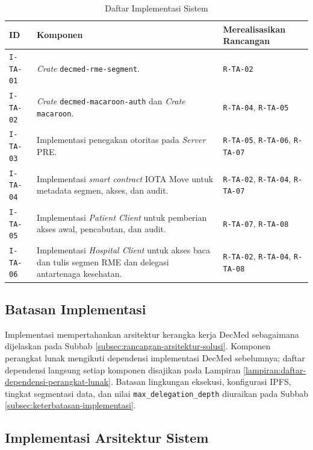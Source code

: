\documentclass[bahasa, 12pt, a4paper, onecolumn, oneside, final]{report}
\begin{document}
\begin{table}[!ht]
	\centering
	\caption{Daftar Implementasi Sistem}
	\label{tab:daftar-implementasi-sistem}
	\small
	\begin{tabular}{|p{}|p{}|p{}|}
		\hline
		\textbf{ID}      & \textbf{Komponen}                                                                                               & \textbf{Merealisasikan Rancangan}                    \\ \hline
		\texttt{I-TA-01} & \textit{Crate} \texttt{decmed-rme-segment}.                                                                     & \texttt{R-TA-02}                                     \\ \hline
		\texttt{I-TA-02} & \textit{Crate} \texttt{decmed-macaroon-auth} dan \textit{Crate} \texttt{macaroon}.                              & \texttt{R-TA-04}, \texttt{R-TA-05}                   \\ \hline
		\texttt{I-TA-03} & Implementasi penegakan otoritas pada \textit{Server} PRE.                                                       & \texttt{R-TA-05}, \texttt{R-TA-06}, \texttt{R-TA-07} \\ \hline
		\texttt{I-TA-04} & Implementasi \textit{smart contract} IOTA Move untuk metadata segmen, akses, dan audit.                         & \texttt{R-TA-02}, \texttt{R-TA-04}, \texttt{R-TA-07} \\ \hline
		\texttt{I-TA-05} & Implementasi \textit{Patient Client} untuk pemberian akses awal, pencabutan, dan audit.                         & \texttt{R-TA-07}, \texttt{R-TA-08}                   \\ \hline
		\texttt{I-TA-06} & Implementasi \textit{Hospital Client} untuk akses baca dan tulis segmen RME dan delegasi antartenaga kesehatan. & \texttt{R-TA-02}, \texttt{R-TA-04}, \texttt{R-TA-08} \\ \hline
	\end{tabular}
\end{table}

\subsection{Batasan Implementasi}
\label{subsec:batasan-implementasi}

Implementasi mempertahankan arsitektur kerangka kerja DecMed sebagaimana dijelaskan pada Subbab \ref{subsec:rancangan-arsitektur-solusi}. Komponen perangkat lunak mengikuti dependensi implementasi DecMed sebelumnya; daftar dependensi langsung setiap komponen disajikan pada Lampiran \ref{lampiran:daftar-dependensi-perangkat-lunak}. Batasan lingkungan eksekusi, konfigurasi IPFS, tingkat segmentasi data, dan nilai \texttt{max\_delegation\_depth} diuraikan pada Subbab \ref{subsec:keterbatasan-implementasi}. \subsection{Implementasi Arsitektur Sistem}
\label{subsec:implementasi-arsitektur-sistem}
\end{document}
